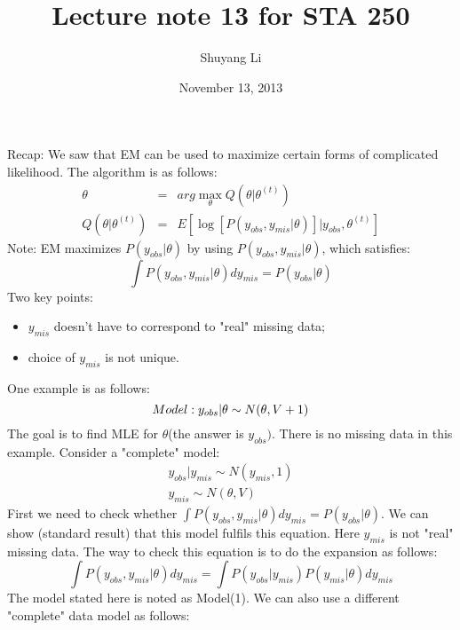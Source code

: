 \documentclass[a4paper]{article}
\author{Shuyang Li}
\title{Lecture note 13  for STA 250}
\date{November 13, 2013}
\begin{document}
\maketitle
Recap: We saw that EM can be used to maximize certain forms of complicated likelihood. The algorithm is as follows:\\
\begin{eqnarray}
\theta &=& arg\max_\theta  Q(\theta | \theta^{(t)})\\
Q(\theta | \theta^{(t)}) &=& E[\log\left[ {P(y_{obs}, y_{mis}\vert \theta)}\right]\vert y_{obs}, \theta^{(t)}]
\end{eqnarray}
Note: EM maximizes ${P(y_{obs}\vert \theta)}$ by using $P(y_{obs},y_{mis}\vert \theta)$, which satisfies:\\
\begin{equation}
\int P(y_{obs}, y_{mis}\vert \theta)dy_{mis} = P(y_{obs}\vert \theta) 
\end{equation}
Two key points: \\
\begin{itemize}
\item $y_{mis}$ doesn't have to correspond to "real" missing data;\\
\item choice of $y_{mis}$ is not unique.\\
\end{itemize}
One example is as follows:
\begin{equation}
Model: y_{obs}\vert \theta \sim  N(\theta, V+1) \\
\end{equation}
The goal is to find MLE for $\theta$(the answer is $y_{obs})$. There is no missing data in this example. Consider a "complete" model:\\
\begin{eqnarray}
y_{obs}\vert y_{mis} \sim N(y_{mis}, 1) \\
y_{mis} \sim N(\theta, V)
\end{eqnarray}
First we need to check whether $\int P(y_{obs}, y_{mis}\vert \theta)dy_{mis} = P(y_{obs}\vert \theta)$. We can show (standard result) that this model fulfils this equation. Here $y_{mis}$ is not "real" missing data. The way to check this equation is to do the expansion as follows: 
\begin{equation}
\int P(y_{obs}, y_{mis}\vert \theta)dy_{mis} = \int P(y_{obs} \vert y_{mis})P(y_{mis} \vert \theta) dy_{mis}
\end{equation}
The model stated here is noted as Model(1). We can also use a different "complete" data model as follows:\\
\end{document}
